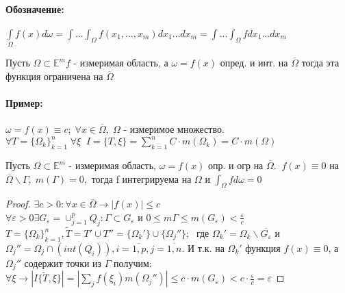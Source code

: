 \documentclass{letnab}
\begin{document}
\paragraph{Обозначение:} $\int\limits_\Omega f(x) d\omega = \int...\int_\Omega f(x_1, \dots, x_m) dx_1\dots dx_m =\int...\int_\Omega f dx_1\dots dx_m   $
\begin{theorem}\vspace{-5pt}
	Пусть $\Omega\subset \mathbb{E}^mf $ - измеримая область, а $\omega = f(x)  $ опред. и инт. на $\overline{\Omega} $ тогда эта функция ограничена на $\overline{\Omega} $
\end{theorem}

\vspace{-10pt}
\paragraph{Пример:} $\omega=f(x)\equiv c; \; \forall x\in \overline{\Omega}, \; \Omega $ - измеримое множество. \\
$\forall T=\{\Omega_k  \}_{k=1}^n \; \forall \xi \;\; I=\{T, \xi \}= \sum_{k=1}^n C\cdot m(\Omega_k) =  C\cdot m(\Omega)$
\vspace{-10pt}
\begin{theorem}
	 Пусть $\Omega\subset \mathbb{E}^m $ - измеримая область, $\omega=f(x)  $ опр. и огр на $\overline{\Omega}. \;\; f(x)\equiv 0 $ на $\overline{\Omega}\backslash \Gamma, \; m(\Gamma)=0, $ тогда f интегрируема на $\Omega$ и $\int_\Omega fd\omega=0 $
\end{theorem}\vspace{-20pt}\begin{proof}
	$\exists c>0 : \forall x\in \overline{\Omega} \rightarrow |f(x)|\leq c $\\
	$\forall \varepsilon>0 \exists G_\varepsilon= \cup_{j=1}^p Q_j : \Gamma \subset G_\varepsilon  $ и $0\leq m\Gamma \leq m(G_\varepsilon) < \frac{ \varepsilon}{c} $\\
	$T=\{\Omega_k  \}_{k=1}^n, \widetilde{T}=T'\cup T'' = \{\Omega_k' \}\cup\{\Omega_j'' \}; \;$  где $\Omega_k'=\Omega_k\backslash \overline{G_\varepsilon}   $ и $\Omega_j''= \Omega_j\cap (int (Q_i)), i=\overline{1,p}, j= \overline{1,n}.$  
	И т.к. на $\Omega_k' $ функция $f(x)\equiv0$, а $\Omega_j'' $ содержит точки из $\Gamma$ получим:\\
	$\forall \xi \rightarrow |I\{\widetilde{T}, \xi \}|= |\sum_j f(\xi_i)m (\Omega_j'') |\leq c\cdot m(G_\varepsilon) < c\cdot \frac{\varepsilon}{c} = \varepsilon $
\end{proof}\vspace{-30pt}
\end{document}
